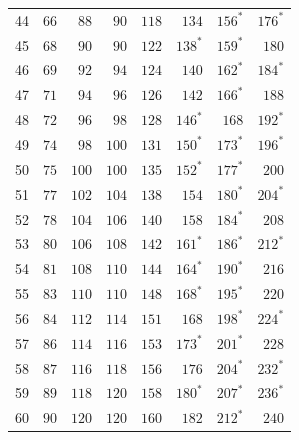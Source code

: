 \begin{longtable}{@{}r*{7}{r}@{}}
44&\(66\)&\(88\)&\(90\)&\(118\)&\(134\)&\(156^{*}\)&\(176^{*}\)\\
45&\(68\)&\(90\)&\(90\)&\(122\)&\(138^{*}\)&\(159^{*}\)&\(180\)\\
46&\(69\)&\(92\)&\(94\)&\(124\)&\(140\)&\(162^{*}\)&\(184^{*}\)\\
47&\(71\)&\(94\)&\(96\)&\(126\)&\(142\)&\(166^{*}\)&\(188\)\\
48&\(72\)&\(96\)&\(98\)&\(128\)&\(146^{*}\)&\(168\)&\(192^{*}\)\\
49&\(74\)&\(98\)&\(100\)&\(131\)&\(150^{*}\)&\(173^{*}\)&\(196^{*}\)\\
50&\(75\)&\(100\)&\(100\)&\(135\)&\(152^{*}\)&\(177^{*}\)&\(200\)\\
51&\(77\)&\(102\)&\(104\)&\(138\)&\(154\)&\(180^{*}\)&\(204^{*}\)\\
52&\(78\)&\(104\)&\(106\)&\(140\)&\(158\)&\(184^{*}\)&\(208\)\\
53&\(80\)&\(106\)&\(108\)&\(142\)&\(161^{*}\)&\(186^{*}\)&\(212^{*}\)\\
54&\(81\)&\(108\)&\(110\)&\(144\)&\(164^{*}\)&\(190^{*}\)&\(216\)\\
55&\(83\)&\(110\)&\(110\)&\(148\)&\(168^{*}\)&\(195^{*}\)&\(220\)\\
56&\(84\)&\(112\)&\(114\)&\(151\)&\(168\)&\(198^{*}\)&\(224^{*}\)\\
57&\(86\)&\(114\)&\(116\)&\(153\)&\(173^{*}\)&\(201^{*}\)&\(228\)\\
58&\(87\)&\(116\)&\(118\)&\(156\)&\(176\)&\(204^{*}\)&\(232^{*}\)\\
59&\(89\)&\(118\)&\(120\)&\(158\)&\(180^{*}\)&\(207^{*}\)&\(236^{*}\)\\
60&\(90\)&\(120\)&\(120\)&\(160\)&\(182\)&\(212^{*}\)&\(240\)\\
\end{longtable}
